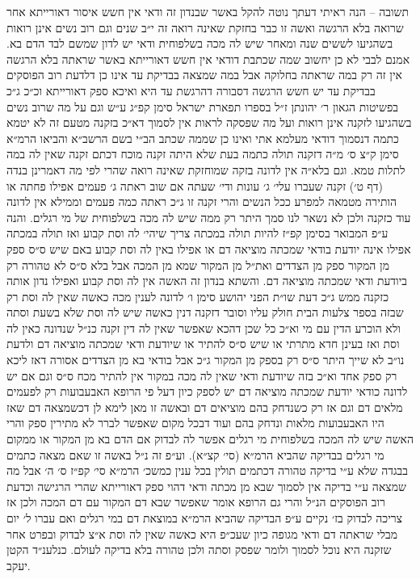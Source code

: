 \documentclass[12pt, openany]{book}
\begin{document}
\begin{multicols}{2}
תשובה – הנה ראיתי דעתך נוטה להקל באשר שבנדון זה ודאי אין חשש איסור דאורייתא אחר שרואה בלא הרגשה ואשה זו כבר בחזקת שאינה רואה זה י״ב שנים וגם רוב נשים אינן רואות בשהגיעו לששים שנה ומאחר שיש לה מכה בשלפוחית ודאי יש לדון שמשם לבד הדם בא. אמנם לבבי לא כן יחשוב שמה שכתבת דודאי אין חשש דאורייתא באשר שראתה בלא הרגשה אין זה רק במה שראתה בחלוקה אבל במה שמצאה בבדיקת עד אינו כן דלדעת רוב הפוסקים בבדיקת עד יש חשש הרגשה דסבורה דהרגשת עד היא ואיכא ספק דאורייתא וכ״כ ג״כ בפשיטות הגאון ר׳ יהונתן ז״ל בספרו תפארת ישראל סימן קפ״ג ע״ש וגם על מה שרוב נשים בשהגיעו לזקנה אינן רואות ועל מה שפסקה לראות אין לסמוך דא״כ בזקנה מטעם זה לא יטמא כתמה דנסמוך דודאי מעלמא אתי ואינו כן שממה שכתב הב״י בשם הרשב״א והביאו הרמ״א סימן ק״צ ס׳ מ״ה דזקנה תולה כתמה בעת שלא היתה זקנה מוכח דכתם זקנה שאין לה במה לתלות טמא. וגם בלא״ה אין לדונה בזקה שמוחזקת שאינה רואה שהרי לפי מה דאמרינן בנדה (דף ט׳) זקנה שעברו עלי׳ ג׳ עונות ודי׳ שעתה אם שוב ראתה ג׳ פעמים אפילו פחתה או הותירה מטמאה למפרע ככל הנשים והרי זקנה זו ג״כ ראתה כמה פעמים וממילא אין לדונה עוד כזקנה ולכן לא נשאר לנו סמך היתר רק ממה שיש לה מכה בשלפוחית של מי רגלים. והנה ע״פ המבואר בסימן קפ״ז להיות תולה במכתה צריך שיהי׳ לה וסת קבוע ואז תולה במכתה אפילו אינה יודעת בודאי שמכתה מוציאה דם או אפילו באין לה וסת קבוע באם שיש ס״ס ספק מן המקור ספק מן הצדדים ואת״ל מן המקור שמא מן המכה אבל בלא ס״ס לא טהורה רק ביודעת ודאי שמכתה מוציאה דם. והשתא בנדון זה האשה אין לה וסת קבוע ואפילו נדון אותה כזקנה ממש ג״כ דעת שו״ת הפני יהושע סימן ו׳ לדונה לענין מכה כאשה שאין לה וסת רק שבזה בספר צלעות הבית חולק עליו וסובר דזקנה דנין כאשה שיש לה וסת שלא בשעת וסתה ולא הוכרע הדין עם מי וא״כ כל שכן דהכא שאפשר שאין לה דין זקנה כנ״ל שנדונה כאין לה וסת ואז בעינן חדא מתרתי או שיש ס״ס להתיר או שיודעת ודאי שמכתה מוציאה דם ולדעת נו״ב לא שייך היתר ס״ס רק בספק מן המקור ג״כ אבל בודאי בא מן הצדדים אסורה דאז ליכא רק ספק אחד וא״כ בזה שיודעת ודאי שאין לה מכה במקור אין להתיר מכח ס״ס וגם אם יש לדונה כודאי יודעת שמכתה מוציאה דם יש לספק כיון דעל פי הרופא האבעבועות רק לפעמים מלאים דם וגם אז רק כשנדחק בהם מוציאים דם ובאשה זו מאן לימא לן דכשמצאה דם שאז היו האבעבועות מלאות ונדחק בהם ועוד דבכל מקום שאפשר לברר לא מתירין ספק והרי האשה שיש לה המכה בשלפוחית מי רגלים אפשר לה לבדוק אם הדם בא מן המקור או ממקום מי רגלים בבדיקה שהביא הרמ״א (סי׳ קצ״א). וע״פ זה נ״ל באשה זו שאם מצאה כתמים בבגדה שלא ע״י בדיקה טהורה דכתמים תולין בכל ענין כמשכ׳ הרמ״א סי׳ קפ״ז ס׳ ה׳ אבל מה שמצאה ע״י בדיקה אין לסמוך שבא מן מכתה ודאי דהוי ספק דאורייתא שהרי הרגישה וכדעת רוב הפוסקים הנ״ל והרי גם הרופא אומר שאפשר שבא דם המקור עם דם המכה ולכן אז צריכה לבדוק בז׳ נקיים ע״פ הבדיקה שהביא הרמ״א במוצאת דם במי רגלים ואם עברו ל׳ יום מבלי שראתה דם ודאי מגופה כיון שעכ״פ היא כאשה שאין לה וסת א״צ לבדוק ובפרט אחר שזקנה היא נוכל לסמוך ולומר שפסק וסתה ולכן טהורה בלא בדיקה לעולם. כנלענ״ד הקטן יעקב.\\\vspace{0pt}

\end{multicols}\newpage
\end{document}
